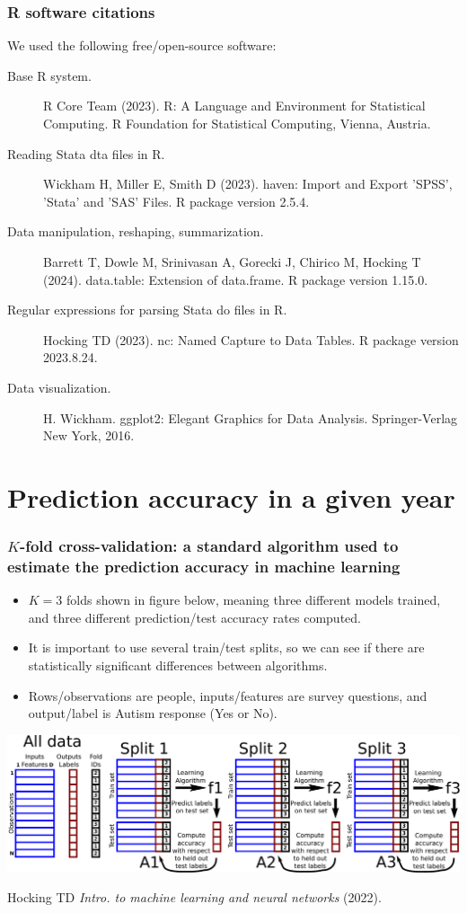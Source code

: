 \documentclass{beamer}
\begin{document}
\begin{frame}
  \frametitle{R software citations}
We used the following free/open-source software:
  \begin{description}
  \item[Base R system.] R Core Team (2023). R: A Language and
    Environment for Statistical Computing. R Foundation for
    Statistical Computing, Vienna, Austria.
  \item[Reading Stata dta files in R.]
  Wickham H, Miller E, Smith D (2023). haven: Import and Export
  'SPSS', 'Stata' and 'SAS' Files. R package version 2.5.4.
  \item[Data manipulation, reshaping, summarization.]   
    Barrett T, Dowle M, Srinivasan A, Gorecki J, Chirico M, Hocking T
    (2024). data.table: Extension of data.frame. R package version
    1.15.0.
  \item[Regular expressions for parsing Stata do files in R.] 
    Hocking TD (2023). nc: Named Capture to Data Tables. R package
    version 2023.8.24.
  \item[Data visualization.]
    H. Wickham. ggplot2: Elegant Graphics for Data Analysis.
    Springer-Verlag New York, 2016.
  \end{description}
\end{frame}

\section{Prediction accuracy in a given year}

\begin{frame}
  \frametitle{$K$-fold cross-validation: a standard algorithm used to estimate the prediction accuracy in machine learning}

  \begin{itemize}
  \item $K=3$ folds shown in figure below, meaning three different
    models trained, and three different prediction/test accuracy rates
    computed.
  \item It is important to use several train/test splits, so we can
    see if there are statistically significant differences between
    algorithms.
  \item Rows/observations are people, inputs/features are survey
    questions, and output/label is Autism response (Yes or No).
  \end{itemize}

  \includegraphics[width=\textwidth]{drawing-cross-validation.pdf}

  \small Hocking TD \emph{Intro. to machine learning and neural
    networks} (2022).
\end{frame}
\end{document}
